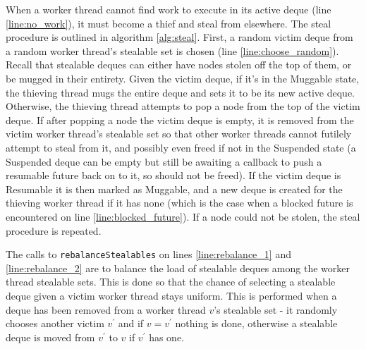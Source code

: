 \documentclass[bsc,frontabs,singlespacing,parskip,deptreport,normalheadings]{infthesis}
\begin{document}
When a worker thread cannot find work to execute in its active deque (line
\ref{line:no_work}), it must become a thief and steal from elsewhere. The steal
procedure is outlined in algorithm \ref{alg:steal}. First, a random victim deque
from a random worker thread's stealable set is chosen (line
\ref{line:choose_random}). Recall that stealable deques can either have nodes
stolen off the top of them, or be mugged in their entirety. Given the victim
deque, if it's in the Muggable state, the thieving thread mugs the entire
deque and sets it to be its new active deque. Otherwise, the thieving thread
attempts to pop a node from the top of the victim deque. If after popping a node
the victim deque is empty, it is removed from the victim worker thread's
stealable set so that other worker threads cannot futilely attempt to steal from
it, and possibly even freed if not in the Suspended state (a Suspended deque can
be empty but still be awaiting a callback to push a resumable future back on to
it, so should not be freed). If the victim deque is Resumable it is then marked
as Muggable, and a new deque is created for the thieving worker thread if it has
none (which is the case when a blocked future is encountered on line
\ref{line:blocked_future}). If a node could not be stolen, the steal procedure
is repeated.

The calls to \texttt{rebalanceStealables} on lines \ref{line:rebalance_1} and
\ref{line:rebalance_2} are to balance the load of stealable deques among the
worker thread stealable sets. This is done so that the chance of selecting a
stealable deque given a victim worker thread stays uniform. This is performed
when a deque has been removed from a worker thread \(v\)'s stealable set - it
randomly chooses another victim \(v^\prime\) and if \(v = v^\prime\) nothing is
done, otherwise a stealable deque is moved from \(v^\prime\) to \(v\) if
\(v^\prime\) has one.
\end{document}
